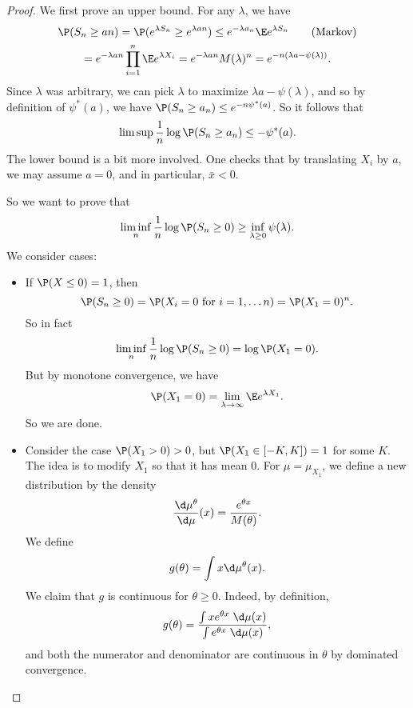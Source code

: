\documentclass[a4paper]{article}
\begin{document}
\begin{proof}
  We first prove an upper bound. For any $\lambda$, we have
  \begin{multline*}
    \P(S_n \geq an) = \P(e^{\lambda S_n} \geq e ^{\lambda an}) \leq e^{-\lambda a_n} \E e^{\lambda S_n} \tag{Markov}\\
    = e^{-\lambda an} \prod_{i = 1}^n \E e^{\lambda X_i} = e^{-\lambda a n} M(\lambda)^n = e^{-n (\lambda a - \psi(\lambda))}.
  \end{multline*}
  Since $\lambda$ was arbitrary, we can pick $\lambda$ to maximize $\lambda a - \psi(\lambda)$, and so by definition of $\psi^*(a)$, we have $\P(S_n \geq a_n) \leq e^{-n \psi^*(a)}$. So it follows that
  \[
    \limsup \frac{1}{n} \log \P(S_n \geq a_n) \leq - \psi^*(a).
  \]
  The lower bound is a bit more involved. One checks that by translating $X_i$ by $a$, we may assume $a = 0$, and in particular, $\bar{x} < 0$.

  So we want to prove that
  \[
    \liminf_n \frac{1}{n} \log \P(S_n \geq 0) \geq \inf_{\lambda \geq 0} \psi(\lambda).
  \]
  We consider cases:
  \begin{itemize}
    \item If $\P(X \leq 0) = 1$, then
      \[
        \P(S_n \geq 0) = \P(X_i = 0\text{ for } i = 1, \ldots n) = \P(X_1 = 0)^n.
      \]
      So in fact
      \[
        \liminf_n \frac{1}{n} \log \P(S_n \geq 0) = \log \P(X_1 = 0).
      \]
      But by monotone convergence, we have
      \[
        \P(X_1 = 0) = \lim_{\lambda \to \infty} \E e^{\lambda X_1}.
      \]
      So we are done.
    \item Consider the case $\P(X_1 > 0) > 0$, but $\P(X_1 \in [-K, K]) = 1$ for some $K$. The idea is to modify $X_1$ so that it has mean $0$. For $\mu = \mu_{X_1}$, we define a new distribution by the density
      \[
        \frac{\d \mu^\theta}{\d \mu}(x) = \frac{e^{\theta x}}{M(\theta)}.
      \]
      We define
      \[
        g(\theta) = \int x \d \mu^\theta(x).
      \]
      We claim that $g$ is continuous for $\theta \geq 0$. Indeed, by definition,
      \[
        g(\theta) = \frac{\int x e^{\theta x}\;\d \mu(x)}{ \int e^{\theta x}\;\d \mu(x)},
      \]
      and both the numerator and denominator are continuous in $\theta$ by dominated convergence.


\end{itemize}
\end{proof}
\end{document}
